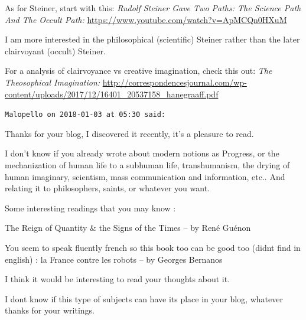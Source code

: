 \begin{footnotesize}
\begin{sffamily}
As for Steiner, start with this: \textit{Rudolf Steiner Gave Two Paths: The Science Path And The Occult Path:} \url{https://www.youtube.com/watch?v=ApMCQn0HXuM}

I am more interested in the philosophical (scientific) Steiner rather than the later clairvoyant (occult) Steiner.

For a analysis of clairvoyance vs creative imagination, check this out: \textit{The Theosophical Imagination:} \url{http://correspondencesjournal.com/wp-content/uploads/2017/12/16401_20537158_hanegraaff.pdf}


\hfill

\texttt{Malopello on 2018-01-03 at 05:30 said: }

Thanks for your blog, I discovered it recently, it's a pleasure to read.

I don't know if you already wrote about modern notions as Progress, or the mechanization of human life to a subhuman life, transhumanism, the drying of human imaginary, scientism, mass communication and information, etc.. And relating it to philosophers, saints, or whatever you want.

Some interesting readings that you may know :

The Reign of Quantity \& the Signs of the Times – by René Guénon

You seem to speak fluently french so this book too can be good too (didnt find in english) : la France contre les robots – by Georges Bernanos

I think it would be interesting to read your thoughts about it.

I dont know if this type of subjects can have its place in your blog, whatever thanks for your writings.


\end{sffamily}\end{footnotesize}
